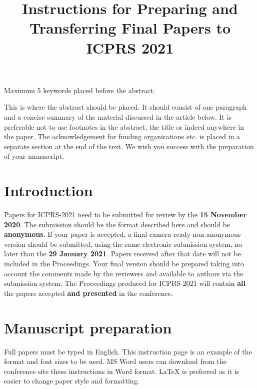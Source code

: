 \documentclass[10pt]{article}
\begin{document}
\noindent



\title{Instructions for Preparing and Transferring Final Papers to \\ICPRS 2021}



\maketitle

\keywords
Maximum 5 keywords placed before the abstract.

\abstract
This is where the abstract should be placed. It should consist
of one paragraph and a concise summary of the material
discussed in the article below. It is preferable not to use
footnotes in the abstract, the title or indeed anywhere in the paper. The acknowledgement
for funding organisations etc. is placed in a separate section at
the end of the text. We wish you success with the preparation
of your manuscript.

\section{Introduction}
Papers for ICPRS-2021 need to be submitted for review by the \textbf{15 November 2020}. The submission should be the format described here and should be \textbf{anonymous}. If your paper is accepted, a final camera-ready non-anonymous version should be submitted, using the same electronic submission system, no later than the \textbf{29 January 2021}. Papers received after that date will not be included in the Proceedings. Your final version should be prepared taking into account the comments made by the reviewers and available to authors via the submission system. The Proceedings produced for ICPRS-2021 will contain \textbf{all} the papers accepted \textbf{and presented} in the conference.  

\section{Manuscript preparation}
Full papers must be typed in English. This instruction page is
an example of the format and font sizes to be used. MS Word
users can download from the conference site these
instructions in Word format. LaTeX is preferred as it is easier to change paper style and formatting.
\end{document}
